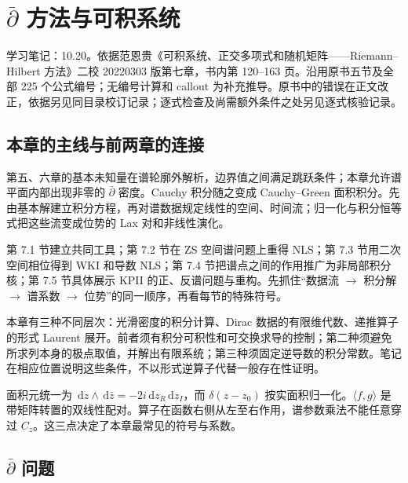 \documentclass[lang=cn,scheme=chinese,mode=simple,device=normal,color=blue,math=cm,thmcnt=section,12pt]{elegantbook}
\newcommand{\dd}{\,\mathrm{d}}
\begin{document}
\tableofcontents\clearpage
\setcounter{chapter}{6}
\chapter{\texorpdfstring{$\bar\partial$}{dbar} 方法与可积系统}
\noindent 学习笔记：10.20。依据范恩贵《可积系统、正交多项式和随机矩阵——Riemann--Hilbert 方法》二校 20220303 版第七章，书内第 120--163 页。沿用原书五节及全部 225 个公式编号；无编号计算和 callout 为补充推导。原书中的错误在正文改正，依据另见同目录校订记录；逐式检查及尚需额外条件之处另见逐式核验记录。

\section*{本章的主线与前两章的连接}
第五、六章的基本未知量在谱轮廓外解析，边界值之间满足跳跃条件；本章允许谱平面内部出现非零的 $\bar\partial$ 密度。Cauchy 积分随之变成 Cauchy--Green 面积积分。先由基本解建立积分方程，再对谱数据规定线性的空间、时间流；归一化与积分恒等式把这些流变成位势的 Lax 对和非线性演化。

第 7.1 节建立共同工具；第 7.2 节在 ZS 空间谱问题上重得 NLS；第 7.3 节用二次空间相位得到 WKI 和导数 NLS；第 7.4 节把谱点之间的作用推广为非局部积分核；第 7.5 节具体展示 KPII 的正、反谱问题与重构。先抓住“数据流 $\to$ 积分解 $\to$ 谱系数 $\to$ 位势”的同一顺序，再看每节的特殊符号。

\begin{callout}
本章有三种不同层次：光滑密度的积分计算、Dirac 数据的有限维代数、递推算子的形式 Laurent 展开。前者须有积分可积性和可交换求导的控制；第二种须避免所求列本身的极点取值，并解出有限系统；第三种须固定逆导数的积分常数。笔记在相应位置说明这些条件，不以形式逆算子代替一般存在性证明。

面积元统一为 $\dd z\wedge\dd\bar z=-2i\dd z_R\dd z_I$，而 $\delta(z-z_0)$ 按实面积归一化。$\langle f,g\rangle$ 是带矩阵转置的双线性配对。算子在函数右侧从左至右作用，谱参数乘法不能任意穿过 $C_z$。这三点决定了本章最常见的符号与系数。
\end{callout}


\section{\texorpdfstring{$\bar\partial$}{dbar} 问题}
\end{document}
